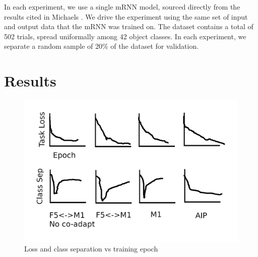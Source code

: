 \documentclass[12pt]{iopart}
\begin{document}
In each experiment, we use a single mRNN model, sourced directly from the results
cited in Michaels \cite{michaels.mrnn}. We drive the experiment using the same set of
input and output data that the mRNN was trained on. The dataset contains a total of
502 trials, spread uniformally among 42 object classes. In each experiment, we separate
a random sample of 20\% of the dataset for validation.

\section{Results}
\label{sec:results}

\begin{figure}[h]
\includegraphics[width=\textwidth]{results_standin.png}
\caption{Loss and class separation vs training epoch}
\centering
\label{fig:results}
\end{figure}
\end{document}
